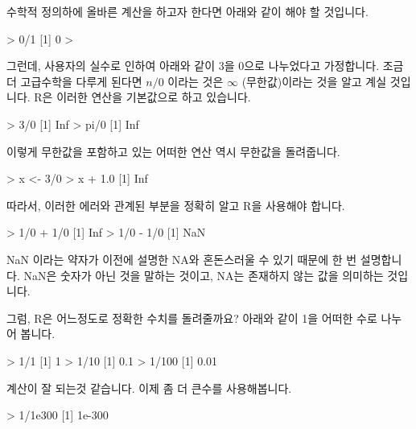 수학적 정의하에 올바른 계산을 하고자 한다면 아래와 같이 해야 할 것입니다. 

\begin{Schunk}
\begin{Soutput}
> 0/1
[1] 0
> 
\end{Soutput}
\end{Schunk}

그런데, 사용자의 실수로 인하여 아래와 같이 3을 0으로 나누었다고 가정합니다. 
조금더 고급수학을 다루게 된다면 $n/0$ 이라는 것은 $\infty$ (무한값)이라는 것을 알고 계실 것입니다.
R은 이러한 연산을 기본값으로 하고 있습니다. 

\begin{Schunk}
\begin{Soutput}
> 3/0
[1] Inf
> pi/0
[1] Inf
\end{Soutput}
\end{Schunk}

이렇게 무한값을 포함하고 있는 어떠한 연산 역시 무한값을 돌려줍니다. 

\begin{Schunk}
\begin{Soutput}
> x <- 3/0
> x + 1.0
[1] Inf
\end{Soutput}
\end{Schunk}

따라서, 이러한 에러와 관계된 부분을 정확히 알고 R을 사용해야 합니다. 

\begin{Schunk}
\begin{Soutput}
> 1/0 + 1/0
[1] Inf
> 1/0 - 1/0
[1] NaN
\end{Soutput}
\end{Schunk}

NaN 이라는 약자가 이전에 설명한 NA와 혼돈스러울 수 있기 때문에 한 번 설명합니다. 
NaN은 숫자가 아닌 것을 말하는 것이고, NA는 존재하지 않는 값을 의미하는 것입니다. 

그럼, R은 어느정도로 정확한 수치를 돌려줄까요? 
아래와 같이 1을 어떠한 수로 나누어 봅니다. 

\begin{Schunk}
\begin{Soutput}
> 1/1
[1] 1
> 1/10
[1] 0.1
> 1/100
[1] 0.01
\end{Soutput}
\end{Schunk}

계산이 잘 되는것 같습니다. 
이제 좀 더 큰수를 사용해봅니다. 

\begin{Schunk}
\begin{Soutput}
> 1/1e300
[1] 1e-300
\end{Soutput}
\end{Schunk}

